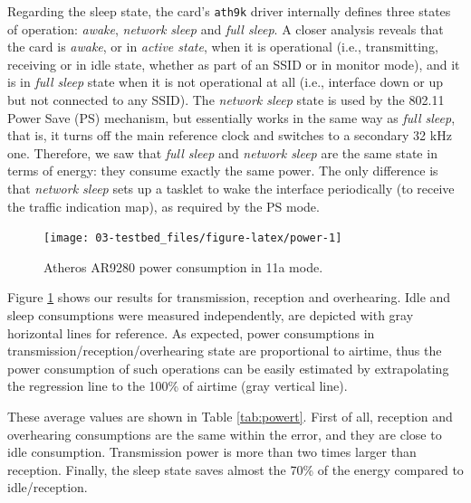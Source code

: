 \documentclass[twoside,nohyper]{tufte-book}
\begin{document}
Regarding the sleep state, the card's \texttt{ath9k} driver internally defines three states of operation: \emph{awake}, \emph{network sleep} and \emph{full sleep}. A closer analysis reveals that the card is \emph{awake}, or in \emph{active state}, when it is operational (i.e., transmitting, receiving or in idle state, whether as part of an SSID or in monitor mode), and it is in \emph{full sleep} state when it is not operational at all (i.e., interface down or up but not connected to any SSID). The \emph{network sleep} state is used by the 802.11 Power Save (PS) mechanism, but essentially works in the same way as \emph{full sleep}, that is, it turns off the main reference clock and switches to a secondary 32 kHz one. Therefore, we saw that \emph{full sleep} and \emph{network sleep} are the same state in terms of energy: they consume exactly the same power. The only difference is that \emph{network sleep} sets up a tasklet to wake the interface periodically (to receive the traffic indication map), as required by the PS mode.



\begin{figure}

{\centering \texttt{[image: 03-testbed\_files/figure-latex/power-1]} 

}

\caption[Atheros AR9280 power consumption in 11a mode.]{Atheros AR9280 power consumption in 11a mode.}\label{fig:power}
\end{figure}

Figure \ref{fig:power} shows our results for transmission, reception and overhearing. Idle and sleep consumptions were measured independently, are depicted with gray horizontal lines for reference. As expected, power consumptions in transmission/reception/overhearing state are proportional to airtime, thus the power consumption of such operations can be easily estimated by extrapolating the regression line to the 100\% of airtime (gray vertical line).

These average values are shown in Table \ref{tab:powert}. First of all, reception and overhearing consumptions are the same within the error, and they are close to idle consumption. Transmission power is more than two times larger than reception. Finally, the sleep state saves almost the 70\% of the energy compared to idle/reception.
\end{document}
